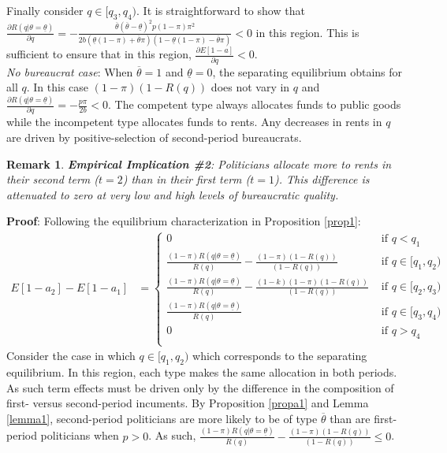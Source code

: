 \documentclass[11pt,english]{article}
\newtheorem{remark}{Remark}
\begin{document}
Finally consider $q\in[q_3, q_4)$. It is straightforward to show that $\frac{\partial R(q|\theta = \underline{\theta})}{\partial q}=-\frac{\overline{\theta}(\overline{\theta}-\underline{\theta})^2p(1-\pi)\pi^2}{2b(\underline{\theta}(1-\pi)+\overline{\theta}\pi)(1-\underline{\theta}(1-\pi)-\overline{\theta}\pi)}<0$ in this region. This is sufficient to ensure that in this region, $\frac{\partial E[1-a]}{\partial q}<0$. \\


\emph{No bureaucrat case}: When $\overline{\theta} = 1$ and $\underline{\theta} = 0$, the separating equilibrium obtains for all $q$. In this case  $(1-\pi)(1-R(q))$ does not vary in $q$ and $\frac{\partial R(q|\theta = \underline{\theta})}{\partial q} = -\frac{p\pi}{2b} < 0$. The competent type always allocates funds to public goods while the incompetent type allocates funds to rents. Any decreases in rents in $q$ are driven by positive-selection of second-period bureaucrats.\\

\begin{remark}\label{rem:ei2}
\textbf{Empirical Implication \#2}: Politicians allocate more to rents in their second term ($t=2$) than in their first term ($t=1$). This difference is attenuated to zero at very low and high levels of bureaucratic quality. 
\end{remark}
\textbf{Proof}: Following the equilibrium characterization in Proposition \ref{prop1}:
\begin{align}\label{eq:remark2}
E[1-a_2]-E[1-a_1]&= 
\begin{cases}
0 & \text{ if }q < q_1\\
 \frac{(1-\pi)R(q|\theta= \underline{\theta})}{R(q)}-\frac{(1-\pi)(1-R(q))}{(1-R(q))}& \text{ if }q \in [q_1, q_2)\\
 \frac{(1-\pi)R(q|\theta= \underline{\theta})}{R(q)}- \frac{(1-k)(1-\pi)(1-R(q))}{(1-R(q))} &\text{ if } q \in [q_2, q_3) \\
 \frac{(1-\pi)R(q|\theta= \underline{\theta})}{R(q)} &\text{ if } q \in [q_3, q_4) \\
0 & \text{ if } q > q_4\\ 
\end{cases}
\end{align}
Consider the case in which $q \in [q_1, q_2)$ which corresponds to the separating equilibrium. In this region, each type makes the same allocation in both periods. As such term effects must be driven only by the difference in the composition of first- versus second-period incuments. By Proposition \ref{propa1} and Lemma \ref{lemma1}, second-period politicians are more likely to be of type $\overline{\theta}$ than are first-period politicians when $p>0$. As such, $\frac{(1-\pi)R(q|\theta= \underline{\theta})}{R(q)}-\frac{(1-\pi)(1-R(q))}{(1-R(q))} \leq 0$. \\
\end{document}
